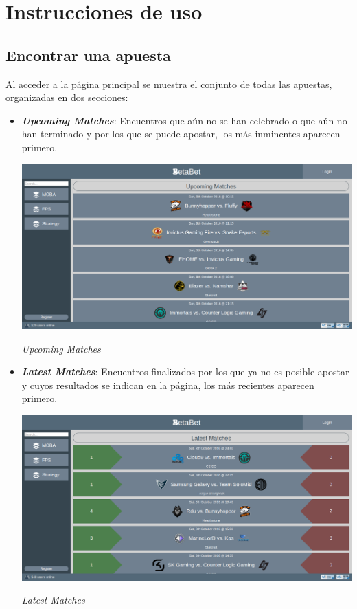 \documentclass{article}
\begin{document}
\section{Instrucciones de uso}
\subsection{Encontrar una apuesta}
Al acceder a la página principal se muestra el conjunto de todas las apuestas, organizadas en dos secciones:
\begin{itemize}
    \item\textbf{\textit{Upcoming Matches}}: Encuentros que aún no se han celebrado o que aún no han terminado y por los que se puede apostar, los más inminentes aparecen primero.
        \smallskip\newline
        \begin{minipage}{\linewidth}
            \centering
            \captionsetup{type=figure}
            \includegraphics[width=\linewidth]{fig1}
            \caption{\textit{Upcoming Matches}}
            \label{fig:fig1}
        \end{minipage}
    \item\textbf{\textit{Latest Matches}}: Encuentros finalizados por los que ya no es posible apostar y cuyos resultados se indican en la página, los más recientes aparecen primero.\
        \smallskip\newline
        \begin{minipage}{\linewidth}
            \centering
            \captionsetup{type=figure}
            \includegraphics[width=\linewidth]{fig2}
            \caption{\textit{Latest Matches}}
            \label{fig:fig2}
        \end{minipage}
\end{itemize}
\end{document}
